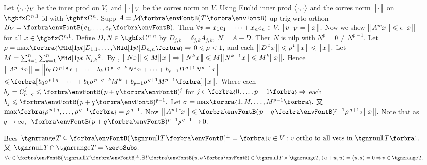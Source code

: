 Let $\big\langle{}\cdot,\cdot{}\big\rangle{_V}$ be the inner prod on $V,$ and $\big\Vert\hspace{1pt}{}{\cdot}{}\hspace{1pt}\big\Vert{_V}$ be the corres norm on $V.$\parSol{}
Using Euclid inner prod $\big\langle{}\cdot,\cdot{}\big\rangle$ and the corres norm $\big\Vert\hspace{1pt}{}{\cdot}{}\hspace{1pt}\big\Vert$ on $\CbbP{n,1}$ id with $\CbbP{n}.$\parSol{}
Supp $A=\Mt{T}$ up-trig wrto orthon $B_V=\Par{e_1,\dots,e_n}.$\parSol{}
Then $\forall v=x_1e_1+\dots+x_ne_n\in V,\big\Vert\hspace{1pt}{}v{}\hspace{1pt}\big\Vert{_V}=\big\Vert\hspace{1pt}{}x{}\hspace{1pt}\big\Vert.$ Now we show $\big\Vert\hspace{1pt}{}A^mx{}\hspace{1pt}\big\Vert\leqslant\epsilon\big\Vert\hspace{1pt}{}x{}\hspace{1pt}\big\Vert$ for all $x\in\CbbP{n,1}.$\parSol{}
Define $D,N\in\CbbP{n,n}$ by $D_{j,k}=\delta_{j,k}A_{j,k},\:N=A-D.$ Then $N$ is nilp with $N^p=0\neq N^{p-1}.$\parSol{}
Let $\rho=\max\!\Bra{\aMid{D_{1,1}},\dots,\aMid{D_{n,n}}}\Rightarrow0\leqslant\rho<1,$ and each $\big\Vert\hspace{1pt}{}D^{\,k}x{}\hspace{1pt}\big\Vert\leqslant\rho^{\,k}\big\Vert\hspace{1pt}{}x{}\hspace{1pt}\big\Vert\leqslant\big\Vert\hspace{1pt}{}x{}\hspace{1pt}\big\Vert.$\vspace{3pt}\parSol{}
Let $M=\sum_{j=1}^n\sum_{k=1}^n\aMidsq{N_{j,k}}.$ \,{By }, $\big\Vert\hspace{1pt}{}Nx{}\hspace{1pt}\big\Vert\leqslant M\big\Vert\hspace{1pt}{}x{}\hspace{1pt}\big\Vert\Rightarrow\big\Vert\hspace{1pt}{}N^{k}x{}\hspace{1pt}\big\Vert\leqslant M\big\Vert\hspace{1pt}{}N^{k-1}x{}\hspace{1pt}\big\Vert\leqslant M^k\big\Vert\hspace{1pt}{}x{}\hspace{1pt}\big\Vert.$\vspace{5pt}\parSol{}
Hence $\big\Vert\hspace{1pt}{}A^{p+q}x{}\hspace{1pt}\big\Vert=\Big\Vert\hspace{1pt}{}b_0D^{\,p+q}x+\dots+b_kD^{\,p+q-k}N^{k}x+\dots+b_{p-1}D^{\,q+1}N^{p-1}x{}\hspace{1pt}\Big\Vert$\vspace{3pt}\parSol{}
$\leqslant\!\BigSbra{{b_0\rho^{\,p+q}+\dots+b_k\rho^{\,p+q-k}M^k+b_{p-1}\rho^{\,q+1}M^{p-1}}}\Dvert{x}.$\vspace{4pt}\parSol{}
Where each $b_j=\mathC_{p+q}^j\leqslant\Par{p+q}{^j}$ for $j\in\;\!\!\Bra{0,\dots,p-1}\Rightarrow$ each $b_j\leqslant\Par{p+q}{^{p-1}}.$\vspace{1pt}\parSol{}
Let $\sigma=\max\!\Bra{1,M,\dots,M^{p-1}}.$ 又 $\max\!\Bra{\rho^{\,p+q},\dots,\rho^{\,q+1}}=\rho^{\,q+1}.$\parSol{}
Now $\Dvert{A^{p+q}x}\leqslant\Par{p+q}{^{p-1}}\rho^{\,q+1}\sigma\Dvert{x}.$ \;Note that as $q\rightarrow\infty,$ \,$\Par{p+q}{^{p-1}}\rho^{\,q+1}\rightarrow0.$\PfEnd
\SepLine
\ChEnd

\pagebreak


\vspace{4pt}

Becs $\range T\subseteq\Par{\null T}{^\perp}=\Bra{v\in V:v\text{ ortho to all vecs in }\null T}.$ 又 $\null T\cap\range T=\zeroSubs.$\PfEnd\parSol{}
\Or $\forall v\in\Par{\null T}{^\perp},\exists\,!\,\Par{u,w}\in\null T\times\range T,\Ang{u+w,u}=\Ang{u,u}=0\Rightarrow v\in\range T.$\PfEnd
\SepLine

